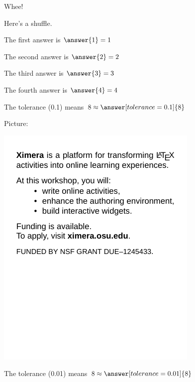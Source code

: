 \documentclass{ximera}
\begin{document}
Whee!

Here's a shuffle.

\begin{shuffle}
  \begin{problem}
    The first answer is $\answer{1} = 1$
  \end{problem}

  \begin{problem}
    The second answer is $\answer{2} = 2$
  \end{problem}

  \begin{problem}
    The third answer is $\answer{3} = 3$
  \end{problem}

  \begin{problem}
    The fourth answer is $\answer{4} = 4$

  \end{problem}
\end{shuffle}

\begin{problem}
  The tolerance (0.1) means $8 \approx \answer[tolerance=0.1]{8}$
\end{problem}

Picture:

\includegraphics{flavor}

\begin{problem}
  The tolerance (0.01) means $8 \approx \answer[tolerance=0.01]{8}$
\end{problem}
\end{document}
